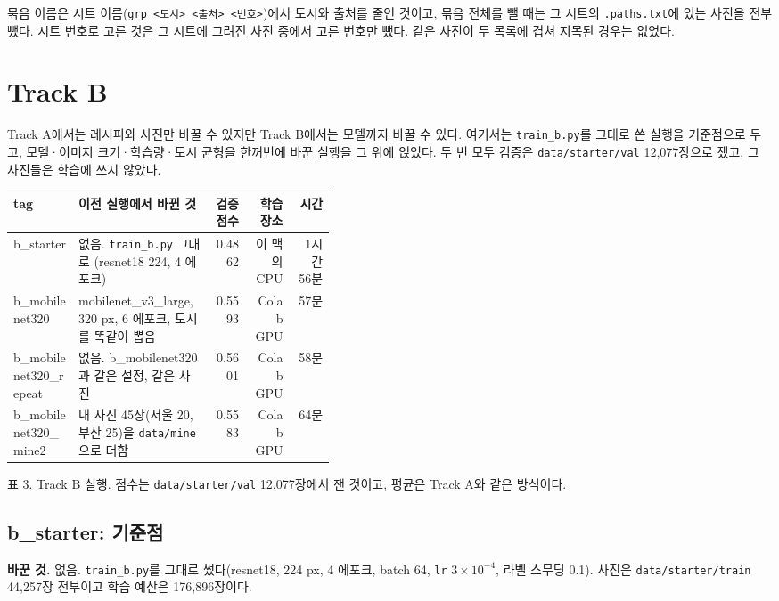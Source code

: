 \documentclass[11pt]{article}
\begin{document}
묶음 이름은 시트 이름(\texttt{grp\_<도시>\_<출처>\_<번호>})에서 도시와 출처를 줄인
것이고, 묶음 전체를 뺄 때는 그 시트의 \texttt{.paths.txt}에 있는 사진을 전부 뺐다.
시트 번호로 고른 것은 그 시트에 그려진 사진 중에서 고른 번호만 뺐다. 같은 사진이 두
목록에 겹쳐 지목된 경우는 없었다.

\section*{Track B}

Track A에서는 레시피와 사진만 바꿀 수 있지만 Track B에서는 모델까지 바꿀 수 있다. 여기서는
\texttt{train\_b.py}를 그대로 쓴 실행을 기준점으로 두고, 모델·이미지 크기·학습량·도시
균형을 한꺼번에 바꾼 실행을 그 위에 얹었다. 두 번 모두 검증은 \texttt{data/starter/val}
12,077장으로 쟀고, 그 사진들은 학습에 쓰지 않았다.

\begin{center}\footnotesize
\begin{tabular}{lp{0.42\linewidth}rrr}
\toprule
tag & 이전 실행에서 바뀐 것 & 검증 점수 & 학습 장소 & 시간 \\
\midrule
b\_starter & 없음. \texttt{train\_b.py} 그대로 (resnet18 224, 4 에포크) & 0.4862 & 이 맥의 CPU & 1시간 56분 \\
b\_mobilenet320 & mobilenet\_v3\_large, 320 px, 6 에포크, 도시를 똑같이 뽑음 & 0.5593 & Colab GPU & 57분 \\
b\_mobilenet320\_repeat & 없음. b\_mobilenet320과 같은 설정, 같은 사진 & 0.5601 & Colab GPU & 58분 \\
b\_mobilenet320\_mine2 & 내 사진 45장(서울 20, 부산 25)을 \texttt{data/mine}으로 더함 & 0.5583 & Colab GPU & 64분 \\
\bottomrule
\end{tabular}

{\footnotesize 표 3. Track B 실행. 점수는 \texttt{data/starter/val} 12,077장에서 잰 것이고, 평균은 Track A와 같은 방식이다.}
\end{center}

\subsection*{b\_starter: 기준점}

\textbf{바꾼 것.} 없음. \texttt{train\_b.py}를 그대로 썼다(resnet18, 224 px, 4 에포크,
batch 64, \texttt{lr} $3\times10^{-4}$, 라벨 스무딩 0.1). 사진은 \texttt{data/starter/train}
44,257장 전부이고 학습 예산은 176,896장이다.
\end{document}

